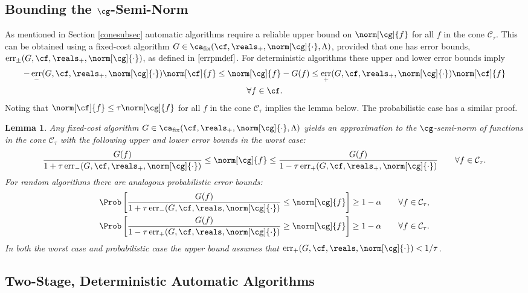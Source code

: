 \documentclass[final]{elsarticle}
\newcommand{\cc}{\mathcal{C}}
\DeclareMathOperator{\err}{err}
\newtheorem{lem}[theorem]{Lemma}
\theoremstyle{definition}
\theoremstyle{remark}
\DeclareMathOperator{\fix}{fix}
\begin{document}
\subsection{Bounding the $\cg$-Semi-Norm}

As mentioned in Section \ref{conesubsec} automatic algorithms require a reliable upper bound on $\norm[\cg]{f}$ for all $f$ in the cone $\cc_{\tau}$. This can be obtained using a fixed-cost algorithm $G \in \ca_{\fix}(\cf,\reals_+,\norm[\cg]{\cdot},\Lambda)$, provided that one has error bounds, $\err_{\pm}(G,\cf,\reals_+,\norm[\cg]{\cdot})$, as defined in $\eqref{errpmdef}$.  For deterministic algorithms these upper and lower error bounds imply 
\begin{multline*}
-\err_{-}(G,\cf,\reals_{+},\norm[\cg]{\cdot}) \norm[\cf]{f} \le \norm[\cg]{f}-G(f) \le \err_{+}(G,\cf,\reals_{+},\norm[\cg]{\cdot}) \norm[\cf]{f} \\ \forall f \in \cf.
\end{multline*}
Noting that $\norm[\cf]{f} \le \tau \norm[\cg]{f}$ for all $f$ in the cone $\cc_{\tau}$ implies the lemma below.  The probabilistic case has a similar proof.

\begin{lem} \label{Gnormlem} Any fixed-cost algorithm $G \in \ca_{\fix}(\cf,\reals_+,\norm[\cg]{\cdot},\Lambda)$ yields an approximation to the $\cg$-semi-norm of functions in the cone $\cc_{\tau}$ with the following upper and lower error bounds in the worst case:
\begin{equation*}
\frac{G(f)}{1 + \tau \err_{-}(G,\cf,\reals_+,\norm[\cg]{\cdot})} \le \norm[\cg]{f} \le \frac{G(f)}{1 - \tau \err_{+}(G,\cf,\reals_+,\norm[\cg]{\cdot})} \qquad \forall f \in \cc_{\tau}.
\end{equation*}
For random algorithms there are analogous probabilistic error bounds:
\begin{gather*}
\Prob\left[\frac{G(f)}{1 + \tau \err_{-}(G,\cf,\reals,\norm[\cg]{\cdot})} \le \norm[\cg]{f} \right] \ge 1 - \alpha \qquad \forall f \in \cc_{\tau}, \\
\Prob\left[\frac{G(f)}{1 - \tau \err_{+}(G,\cf,\reals,\norm[\cg]{\cdot})} \ge \norm[\cg]{f} \right] \ge 1 - \alpha \qquad \forall f \in \cc_{\tau}.
\end{gather*}
In both the worst case and probabilistic case the upper bound assumes that  $\err_{+}(G,\cf,\reals,\norm[\cg]{\cdot}) < 1/\tau$.
\end{lem}

\subsection{Two-Stage, Deterministic Automatic Algorithms}
\end{document}
